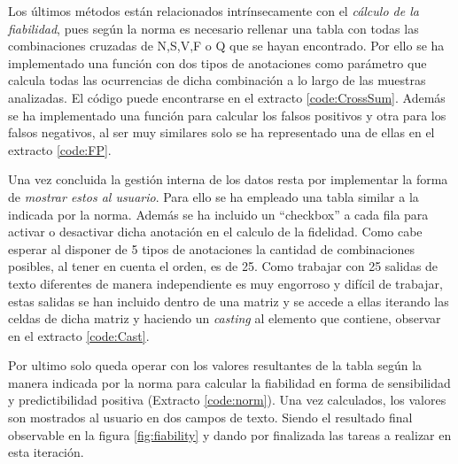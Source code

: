     Los últimos métodos están relacionados intrínsecamente con el \textit{cálculo de la fiabilidad}, pues según la norma es necesario rellenar una tabla con todas las combinaciones cruzadas de N,S,V,F o Q que se hayan encontrado. Por ello se ha implementado una función con dos tipos de anotaciones como parámetro que calcula todas las ocurrencias de dicha combinación a lo largo de las muestras analizadas. El código puede encontrarse en el extracto \ref{code:CrossSum}. Además se ha implementado una función para calcular los falsos positivos y otra para los falsos negativos, al ser muy similares solo se ha representado una de ellas en el extracto \ref{code:FP}.
        
  
    \clearpage
    Una vez concluida la gestión interna de los datos resta por implementar la forma de\textit{ mostrar estos al usuario}. Para ello se ha empleado una tabla similar a la indicada por la norma.\cite{Aenor2002} Además se ha incluido un ``checkbox'' a cada fila para activar o desactivar dicha anotación en el calculo de la fidelidad. Como cabe esperar al disponer de 5 tipos de anotaciones la cantidad de combinaciones posibles, al tener en cuenta el orden, es de 25. Como trabajar con 25 salidas de texto diferentes de manera independiente es muy engorroso y difícil de trabajar, estas salidas se han incluido dentro de una matriz y se accede a ellas iterando las celdas de dicha matriz y haciendo un \textit{casting} al elemento que contiene, observar en el extracto \ref{code:Cast}. 
        
        
    Por ultimo solo queda operar con los valores resultantes de la tabla según la manera indicada por la norma para calcular la fiabilidad en forma de sensibilidad y predictibilidad positiva (Extracto \ref{code:norm}). Una vez calculados, los valores son mostrados al usuario en dos campos de texto. Siendo el resultado final observable en la figura \ref{fig:fiability} y dando por finalizada las tareas a realizar en esta iteración.
        
        
